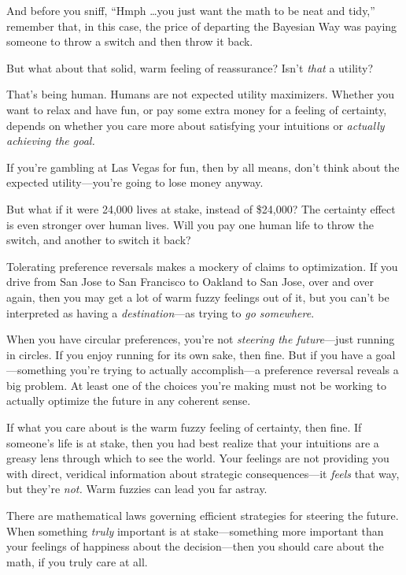 {
 And before you sniff, ``Hmph \ldots you just want
the math to be neat and tidy,'' remember that, in
this case, the price of departing the Bayesian Way was paying someone
to throw a switch and then throw it back.}

{
 But what about that solid, warm feeling of reassurance?
Isn't \textit{that} a utility?}

{
 That's being human. Humans are not expected
utility maximizers. Whether you want to relax and have fun, or pay some
extra money for a feeling of certainty, depends on whether you care
more about satisfying your intuitions or \textit{actually achieving the
goal.}}

{
 If you're gambling at Las Vegas for fun, then by
all means, don't think about the expected
utility---you're going to lose money anyway.}

{
 But what if it were 24,000 lives at stake, instead of \$24,000?
The certainty effect is even stronger over human lives. Will you pay
one human life to throw the switch, and another to switch it back?}

{
 Tolerating preference reversals makes a mockery of claims to
optimization. If you drive from San Jose to San Francisco to Oakland to
San Jose, over and over again, then you may get a lot of warm fuzzy
feelings out of it, but you can't be interpreted as
having a \textit{destination}{}---as trying to \textit{go somewhere}.}

{
 When you have circular preferences, you're not
\textit{steering the future}{}---just running in circles. If you enjoy
running for its own sake, then fine. But if you have a goal---something
you're trying to actually accomplish---a preference
reversal reveals a big problem. At least one of the choices
you're making must not be working to actually optimize
the future in any coherent sense.}

{
 If what you care about is the warm fuzzy feeling of certainty,
then fine. If someone's life is at stake, then you had
best realize that your intuitions are a greasy lens through which to
see the world. Your feelings are not providing you with direct,
veridical information about strategic consequences---it \textit{feels}
that way, but they're \textit{not.} Warm fuzzies can
lead you far astray.}

{
 There are mathematical laws governing efficient strategies for
steering the future. When something \textit{truly} important is at
stake---something more important than your feelings of happiness about
the decision---then you should care about the math, if you truly care
at all.}


